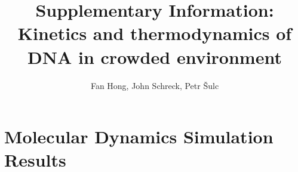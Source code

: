 \documentclass[]{article}
\title{Supplementary Information: Kinetics and thermodynamics of DNA in crowded environment}
\author{Fan Hong, John Schreck, Petr \v{S}ulc}
\begin{document}
\maketitle


\section{Molecular Dynamics Simulation Results}
\end{document}
